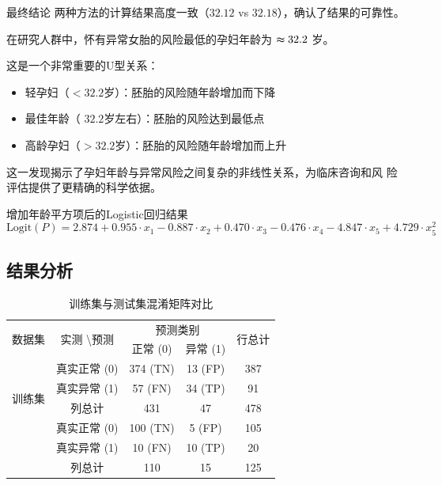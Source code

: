 \documentclass[withoutpreface,notoc]{cumcmthesis}
\begin{document}
	最终结论
	两种方法的计算结果高度一致（$32.12$ vs $32.18$），确认了结果的可靠性。

	在研究人群中，怀有异常女胎的风险最低的孕妇年龄为  $\thickapprox 32.2$ 岁。

	这是一个非常重要的U型关系：

	\begin{itemize}
	\item 轻孕妇（$<32.2$岁）：胚胎的风险随年龄增加而下降
	\item 最佳年龄（ $32.2$岁左右）：胚胎的风险达到最低点
	\item 高龄孕妇（$>32.2$岁）：胚胎的风险随年龄增加而上升
	\end{itemize}

	这一发现揭示了孕妇年龄与异常风险之间复杂的非线性关系，为临床咨询和风
	险评估提供了更精确的科学依据。

	增加年龄平方项后的Logistic回归结果
	\begin{equation*}
	\label{logit2}
	\text{Logit}(P) = 2.874 + 0.955 \cdot x_{1} - 0.887 \cdot x_{2} + 0.470 \cdot x_{3} - 0.476 \cdot x_{4} - 4.847 \cdot x_{5} +4.729 \cdot x^{2}_{5}
	\end{equation*}


	\subsection{结果分析}

	\begin{table}[H]
	\centering
	\caption{训练集与测试集混淆矩阵对比}
	\label{训练集与测试集混淆矩阵对比}
		\begin{tabular}{|c|c|c|c|c|}
		\hline
		\multirow{2}{*}{数据集} & \multirow{2}{*}{实测 \textbackslash 预测} & \multicolumn{2}{c|}{预测类别} & \multirow{2}{*}{行总计} \\ \cline{3-4}
		& & 正常 (0) & 异常 (1) & \\ \hline
		\multirow{4}{*}{训练集} & 真实正常 (0) & 374 (TN) & 13 (FP) & 387 \\ \cline{2-5}
		& 真实异常 (1) & 57 (FN) & 34 (TP) & 91 \\ \cline{2-5}
		& 列总计 & 431 & 47 & 478 \\ \hline
		\multirow{4}{*}{测试集} & 真实正常 (0) & 100 (TN) & 5 (FP) & 105 \\ \cline{2-5}
		& 真实异常 (1) & 10 (FN) & 10 (TP) & 20 \\ \cline{2-5}
		& 列总计 & 110 & 15 & 125 \\ \hline
		\end{tabular}
	\end{table}
\end{document}
